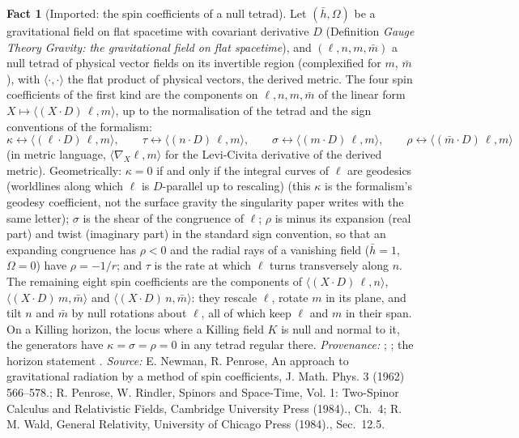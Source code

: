 \documentclass[11pt]{article}
\theoremstyle{definition}
\newtheorem{fact}[theorem]{Fact}
\theoremstyle{plain}
\providecommand{\hb}{}\renewcommand{\hb}{\bar{h}}
\providecommand{\mb}{}\renewcommand{\mb}{\bar m}
\providecommand{\ip}{}\renewcommand{\ip}[2]{\langle #1, #2\rangle}
\begin{document}
\begin{fact}[Imported: the spin coefficients of a null tetrad]\label{c:pairing.imported-spin-coefficients-null-tetrad}
Let $(\hb, \Omega)$ be a gravitational field on flat spacetime with covariant derivative $D$ (Definition \emph{Gauge Theory Gravity: the gravitational field on flat spacetime}), and $(\ell, n, m, \mb)$ a null tetrad of physical vector fields on its invertible region (complexified for $m$, $\mb$), with $\ip{\cdot}{\cdot}$ the flat product of physical vectors, the derived metric. The four spin coefficients of the first kind are the components on $\ell, n, m, \mb$ of the linear form $X \mapsto \ip{(X \cdot D)\, \ell}{m}$, up to the normalisation of the tetrad and the sign conventions of the formalism:
\[
\kappa \leftrightarrow \ip{(\ell \cdot D)\, \ell}{m}, \qquad \tau \leftrightarrow \ip{(n \cdot D)\, \ell}{m}, \qquad \sigma \leftrightarrow \ip{(m \cdot D)\, \ell}{m}, \qquad \rho \leftrightarrow \ip{(\mb \cdot D)\, \ell}{m}
\]
(in metric language, $\ip{\nabla_X \ell}{m}$ for the Levi-Civita derivative of the derived metric).
Geometrically: $\kappa = 0$ if and only if the integral curves of $\ell$ are geodesics (worldlines along which $\ell$ is $D$-parallel up to rescaling) (this $\kappa$ is the formalism's geodesy coefficient, not the surface gravity the singularity paper writes with the same letter); $\sigma$ is the shear of the congruence of $\ell$; $\rho$ is minus its expansion (real part) and twist (imaginary part) in the standard sign convention, so that an expanding congruence has $\rho < 0$ and the radial rays of a vanishing field ($\hb = 1$, $\Omega = 0$) have $\rho = -1/r$; and $\tau$ is the rate at which $\ell$ turns transversely along $n$. The remaining eight spin coefficients are the components of $\ip{(X \cdot D)\, \ell}{n}$, $\ip{(X \cdot D)\, m}{\mb}$ and $\ip{(X \cdot D)\, n}{\mb}$: they rescale $\ell$, rotate $m$ in its plane, and tilt $n$ and $\mb$ by null rotations about $\ell$, all of which keep $\ell$ and $m$ in their span. On a Killing horizon, the locus where a Killing field $K$ is null and normal to it, the generators have $\kappa = \sigma = \rho = 0$ in any tetrad regular there. \emph{Provenance:} \cite{NewmanPenrose1962}; \cite[Ch.~4]{PenroseRindler1}; the horizon statement \cite[Sec.~12.5]{Wald1984}.
\emph{Source:} E. Newman, R. Penrose, An approach to gravitational radiation by a method of spin coefficients, J. Math. Phys. 3 (1962) 566--578.; R. Penrose, W. Rindler, Spinors and Space-Time, Vol. 1: Two-Spinor Calculus and Relativistic Fields, Cambridge University Press (1984)., Ch.~4; R. M. Wald, General Relativity, University of Chicago Press (1984)., Sec.~12.5.
\end{fact}
\end{document}

